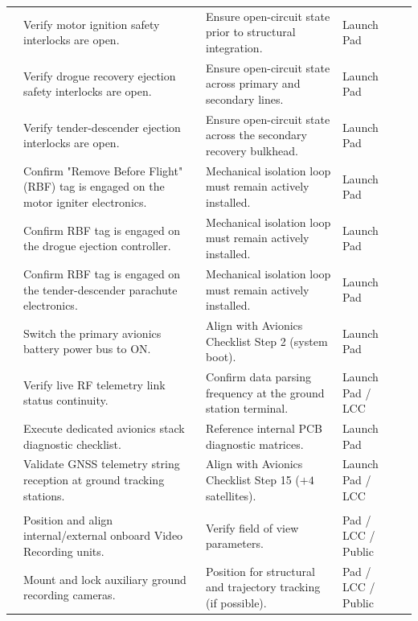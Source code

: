 \documentclass[11pt,a4paper]{article}
\begin{document}
\begin{xltabular}{\textwidth}{|>{\centering\arraybackslash}p{0.6cm}|X|X|>{\centering\arraybackslash}p{2.8cm}|>{\centering\arraybackslash}p{1.0cm}|}
     \\  & Verify motor ignition safety interlocks are open. & Ensure open-circuit state prior to structural integration. & Launch Pad & \\  & Verify drogue recovery ejection safety interlocks are open. & Ensure open-circuit state across primary and secondary lines. & Launch Pad & \\  & Verify tender-descender ejection interlocks are open. & Ensure open-circuit state across the secondary recovery bulkhead. & Launch Pad & \\  & Confirm "Remove Before Flight" (RBF) tag is engaged on the motor igniter electronics. & Mechanical isolation loop must remain actively installed. & Launch Pad & \\  & Confirm RBF tag is engaged on the drogue ejection controller. & Mechanical isolation loop must remain actively installed. & Launch Pad & \\  & Confirm RBF tag is engaged on the tender-descender parachute electronics. & Mechanical isolation loop must remain actively installed. & Launch Pad & \\  & Switch the primary avionics battery power bus to ON. & Align with Avionics Checklist Step 2 (system boot). & Launch Pad & \\  &Verify live RF telemetry link status continuity. & Confirm data parsing frequency at the ground station terminal. & Launch Pad / LCC & \\  & Execute dedicated avionics stack diagnostic checklist. & Reference internal PCB diagnostic matrices. & Launch Pad & \\  &Validate GNSS telemetry string reception at ground tracking stations. & Align with Avionics Checklist Step 15 ($+4$ satellites). & Launch Pad / LCC & \\ \hline
    
     \\  & Position and align internal/external onboard Video Recording units. & Verify field of view parameters. & Pad / LCC / Public & \\  & Mount and lock auxiliary ground recording cameras. & Position for structural and trajectory tracking (if possible). & Pad / LCC / Public & \\ \hline
    

\end{xltabular}
\end{document}
